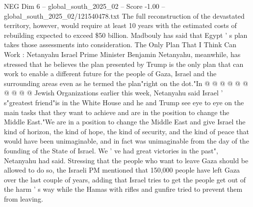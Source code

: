 \begin{textsample}{NEG Dim 6 – global\_south\_2025\_02 – Score -1.00 – global\_south\_2025\_02/121540478.txt}
The full reconstruction of the devastated territory, however, would require at least 10 years with the estimated costs of rebuilding expected to exceed \$50 billion.
Madbouly has said that Egypt ' s plan takes those assessments into consideration.
The Only Plan That I Think Can Work : Netanyahu Israel Prime Minister Benjamin Netanyahu, meanwhile, has stressed that he believes the plan presented by Trump is the only plan that can work to enable a different future for the people of Gaza, Israel and the surrounding areas even as he termed the plan"right on the dot."In @ @ @ @ @ @ @ @ @ @ Jewish Organizations earlier this week, Netanyahu said Israel ' s"greatest friend"is in the White House and he and Trump see eye to eye on the main tasks that they want to achieve and are in the position to change the Middle East."We are in a position to change the Middle East and give Israel the kind of horizon, the kind of hope, the kind of security, and the kind of peace that would have been unimaginable, and in fact was unimaginable from the day of the founding of the State of Israel.
We ' ve had great victories in the past", Netanyahu had said.
Stressing that the people who want to leave Gaza should be allowed to do so, the Israeli PM mentioned that 150,000 people have left Gaza over the last couple of years, adding that Israel tries to get the people get out of the harm ' s way while the Hamas with rifles and gunfire tried to prevent them from leaving.

\end{textsample}

